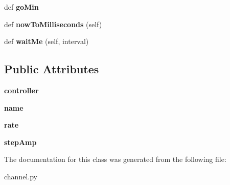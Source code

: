 \begin{DoxyCompactItemize}
\item 
\hypertarget{classpyagilis_1_1channel_1_1_axis_a87ae68b64bf7fa461771332a816881c3}{}def {\bfseries go\+Min}\label{classpyagilis_1_1channel_1_1_axis_a87ae68b64bf7fa461771332a816881c3}

\item 
\hypertarget{classpyagilis_1_1channel_1_1_axis_a35b891433b2442ecc6dfea5173afc474}{}def {\bfseries now\+To\+Milliseconds} (self)\label{classpyagilis_1_1channel_1_1_axis_a35b891433b2442ecc6dfea5173afc474}

\item 
\hypertarget{classpyagilis_1_1channel_1_1_axis_a64b33a63785163690ef6cb614cf82d89}{}def {\bfseries wait\+Me} (self, interval)\label{classpyagilis_1_1channel_1_1_axis_a64b33a63785163690ef6cb614cf82d89}

\end{DoxyCompactItemize}
\subsection*{Public Attributes}
\begin{DoxyCompactItemize}
\item 
\hypertarget{classpyagilis_1_1channel_1_1_axis_a1012600214e52116d1ffeb867e31bc71}{}{\bfseries controller}\label{classpyagilis_1_1channel_1_1_axis_a1012600214e52116d1ffeb867e31bc71}

\item 
\hypertarget{classpyagilis_1_1channel_1_1_axis_a8f5e7062a84a856b6da6caf72e4b009a}{}{\bfseries name}\label{classpyagilis_1_1channel_1_1_axis_a8f5e7062a84a856b6da6caf72e4b009a}

\item 
\hypertarget{classpyagilis_1_1channel_1_1_axis_a1a7fae27a7e1c59866900893c4f38e54}{}{\bfseries rate}\label{classpyagilis_1_1channel_1_1_axis_a1a7fae27a7e1c59866900893c4f38e54}

\item 
\hypertarget{classpyagilis_1_1channel_1_1_axis_af1661ca84757249d14c3b8275e4a01c9}{}{\bfseries step\+Amp}\label{classpyagilis_1_1channel_1_1_axis_af1661ca84757249d14c3b8275e4a01c9}

\end{DoxyCompactItemize}


The documentation for this class was generated from the following file\+:\begin{DoxyCompactItemize}
\item 
channel.\+py\end{DoxyCompactItemize}
